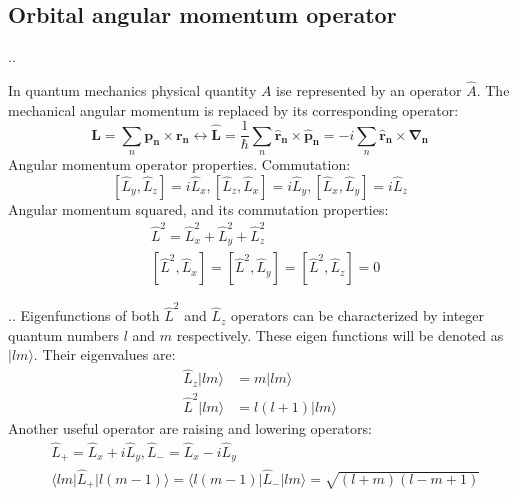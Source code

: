 \documentclass{beamer}
\begin{document}
\subsection{Orbital angular momentum operator}
\begin{frame}{\thesection.\thesubsection. \insertsubsection}
	
     
     In quantum mechanics physical quantity $A$ ise represented by an operator $\hat{A}$. The mechanical angular momentum is replaced by its corresponding operator:
		\begin{equation}
		\bm{L} = \sum_{n} \bm{p_n} \times \bm{r_n}  \longleftrightarrow \bm{\hat{L}} = \dfrac{1}{\hbar} \sum_{n} \bm{\hat{r}_n} \times \bm{\hat{p}_n} =   -i \sum_{n} \bm{\hat{r}_n} \times \bm{\nabla_n}
		\end{equation}
     Angular momentum operator properties. Commutation:
		\begin{equation}\label{eq:Lz_commutation}
		  [\hat{L}_y,\hat{L}_z] = i\hat{L}_x, [\hat{L}_z,\hat{L}_x] = i\hat{L}_y, [\hat{L}_x,\hat{L}_y] = i\hat{L}_z
    	\end{equation}
     Angular momentum squared, and its commutation properties:
        \begin{align}
          &\hat{L}^2 = \hat{L}_x^2 + \hat{L}_y^2 + \hat{L}_z^2 \\
          &[\hat{L}^2, \hat{L}_x]=[\hat{L}^2, \hat{L}_y]=[\hat{L}^2, \hat{L}_z]= 0       
        \end{align}        


\end{frame}

\begin{frame}{\thesection.\thesubsection. \insertsubsection}
    Eigenfunctions of both $\hat{L}^2$ and $\hat{L}_z$ operators can be characterized by integer quantum numbers $l$  and $m$ respectively. These eigen functions will be denoted as $\vert lm \rangle$. Their eigenvalues are:
		\begin{align}
		\hat{L}_z \vert lm \rangle &= m \vert lm \rangle \\
		\hat{L}^2 \vert lm \rangle &= l(l+1) \vert lm \rangle
		\end{align}
    Another useful operator are raising and lowering operators:
		\begin{align}
		  &\hat{L}_{+} = \hat{L}_x + i\hat{L}_y, \hat{L}_{-} = \hat{L}_x - i\hat{L}_y\\
		  &\langle lm \vert \hat{L}_{+} \vert l (m-1) \rangle = \langle l(m-1) \vert \hat{L}_{-} \vert lm \rangle = \sqrt{(l+m)(l-m+1)} \label{eq:L+}
		\end{align}

	
\end{frame}
\end{document}
